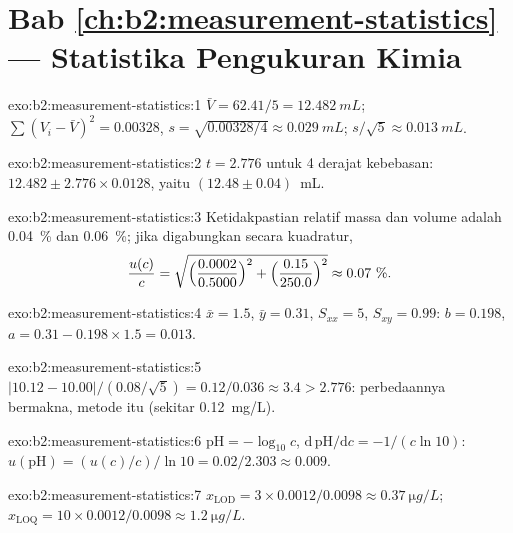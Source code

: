 \section*{Bab \ref{ch:b2:measurement-statistics} --- Statistika Pengukuran Kimia}

\begin{solution}{exo:b2:measurement-statistics:1}
$\bar V = 62.41/5 = \qty{12.482}{mL}$; $\sum(V_i - \bar V)^2 = 0.00328$, $s = \sqrt{0.00328/4} \approx
\qty{0.029}{mL}$; $s/\sqrt5 \approx \qty{0.013}{mL}$.
\end{solution}

\begin{solution}{exo:b2:measurement-statistics:2}
$t = 2.776$ untuk 4 derajat kebebasan: $12.482 \pm 2.776 \times 0.0128$, yaitu $(12.48 \pm 0.04)$~mL.
\end{solution}

\begin{solution}{exo:b2:measurement-statistics:3}
Ketidakpastian relatif massa dan volume adalah 0.04~\% dan 0.06~\%; jika
digabungkan secara
kuadratur,
\[\frac{u(c)}{c} = \sqrt{\Bigl(\frac{0.0002}{0.5000}\Bigr)^2 + \Bigl(\frac{0.15}{250.0}\Bigr)^2}
\approx 0.07~\%.\]
\end{solution}

\begin{solution}{exo:b2:measurement-statistics:4}
$\bar x = 1.5$, $\bar y = 0.31$, $S_{xx} = 5$, $S_{xy} = 0.99$: $b = 0.198$, $a = 0.31 - 0.198 \times 1.5
= 0.013$.
\end{solution}

\begin{solution}{exo:b2:measurement-statistics:5}
$|10.12 - 10.00|/(0.08/\sqrt5) = 0.12/0.036 \approx 3.4 > 2.776$: perbedaannya
bermakna, metode itu  (sekitar \qty{+0.12}{mg/L}).
\end{solution}

\begin{solution}{exo:b2:measurement-statistics:6}
$\mathrm{pH} = -\log_{10}c$, $\mathrm d\,\mathrm{pH}/\mathrm dc = -1/(c\ln10)$:
$u(\mathrm{pH}) = (u(c)/c)/\ln10 = 0.02/2.303 \approx 0.009$.
\end{solution}

\begin{solution}{exo:b2:measurement-statistics:7}
$x_{\mathrm{LOD}} = 3 \times 0.0012/0.0098 \approx \qty{0.37}{\micro g/L}$; $x_{\mathrm{LOQ}} = 10
\times 0.0012/0.0098 \approx \qty{1.2}{\micro g/L}$.
\end{solution}

